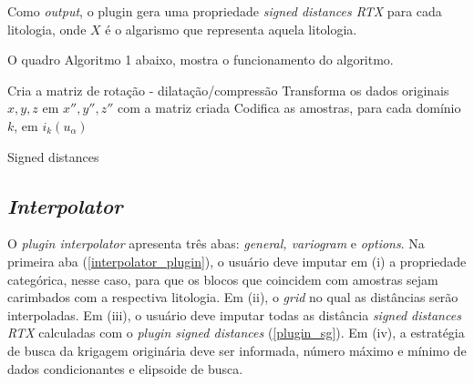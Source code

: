 Como \textit{output}, o plugin gera uma propriedade \textit{signed distances RTX} para cada litologia, onde $X$ é o algarismo que representa aquela litologia.

O quadro Algoritmo 1 abaixo, mostra o funcionamento do algoritmo.

\begin{algorithm}[!ht]
Cria a matriz de rotação - dilatação/compressão\;
Transforma os dados originais $x,y,z$ em $x'',y'',z''$ com a matriz criada\;
Codifica as amostras, para cada domínio $k$, em $i_k(u_\alpha)$\; 
\caption{Signed distances}
\end{algorithm}
 
\subsection{\textit{Interpolator}}\label{interpolator_sec}

O \textit{plugin interpolator} apresenta três abas: \textit{general, variogram} e \textit{options}. Na primeira aba (\autoref{interpolator_plugin}), o usuário deve imputar em (i) a propriedade categórica, nesse caso, para que os blocos que coincidem com amostras sejam carimbados com a respectiva litologia. Em (ii), o \textit{grid} no qual as distâncias serão interpoladas. Em (iii), o usuário deve imputar todas as distância \textit{signed distances RTX} calculadas com o \textit{plugin signed distances} (\autoref{plugin_sg}). Em (iv), a estratégia de busca da krigagem originária deve ser informada, número máximo e mínimo de dados condicionantes e elipsoide de busca.

